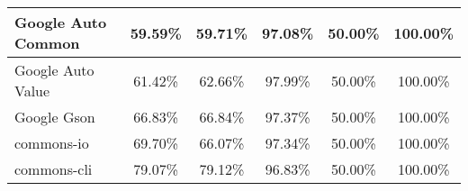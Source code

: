 \documentclass[../../main]{subfiles}
\begin{document}
\begin{table}[htb]
\begin{tabular}{|l|c|c|c|c|c|}
Google Auto Common            & 59.59\%                                                                                 & 59.71\%                                                                                     & 97.08\%                                                                              & 50.00\%                                                                               & 100.00\%                                                                             \\ \hline
Google Auto Value             & 61.42\%                                                                                 & 62.66\%                                                                                     & 97.99\%                                                                              & 50.00\%                                                                               & 100.00\%                                                                             \\ \hline
Google Gson                   & 66.83\%                                                                                 & 66.84\%                                                                                     & 97.37\%                                                                              & 50.00\%                                                                               & 100.00\%                                                                             \\ \hline
commons-io                    & 69.70\%                                                                                 & 66.07\%                                                                                     & 97.34\%                                                                              & 50.00\%                                                                               & 100.00\%                                                                             \\ \hline
commons-cli                   & 79.07\%                                                                                 & 79.12\%                                                                                     & 96.83\%                                                                              & 50.00\%                                                                               & 100.00\%                                                                             \\ \hline

\end{tabular}
\end{table}
\end{document}
